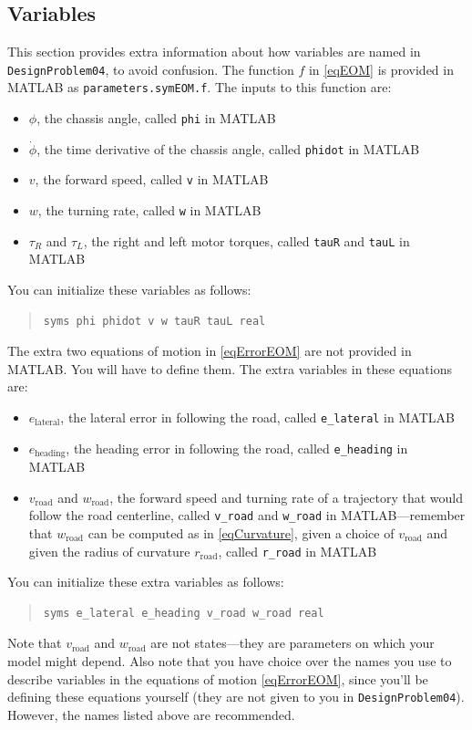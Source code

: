 \documentclass[12pt]{article}
\begin{document}
\subsection{Variables}

This section provides extra information about how variables are named in \lstinline|DesignProblem04|, to avoid confusion. The function $f$ in \eqref{eqEOM} is provided in MATLAB as \lstinline|parameters.symEOM.f|. The inputs to this function are:
\begin{itemize}
\item $\phi$, the chassis angle, called \lstinline|phi| in MATLAB
\item $\dot{\phi}$, the time derivative of the chassis angle, called \lstinline|phidot| in MATLAB
\item $v$, the forward speed, called \lstinline|v| in MATLAB
\item $w$, the turning rate, called \lstinline|w| in MATLAB
\item $\tau_{R}$ and $\tau_{L}$, the right and left motor torques, called \lstinline|tauR| and \lstinline|tauL| in MATLAB
\end{itemize}
You can initialize these variables as follows:
\begin{quote}
\begin{lstlisting}
syms phi phidot v w tauR tauL real
\end{lstlisting}
\end{quote}
The extra two equations of motion in \eqref{eqErrorEOM} are not provided in MATLAB. You will have to define them. The extra variables in these equations are:
\begin{itemize}
\item $e_\text{lateral}$, the lateral error in following the road, called \lstinline|e_lateral| in MATLAB
\item $e_\text{heading}$, the heading error in following the road, called \lstinline|e_heading| in MATLAB
\item $v_\text{road}$ and $w_\text{road}$, the forward speed and turning rate of a trajectory that would follow the road centerline, called \lstinline|v_road| and \lstinline|w_road| in MATLAB---remember that $w_\text{road}$ can be computed as in \eqref{eqCurvature}, given a choice of $v_\text{road}$ and given the radius of curvature $r_\text{road}$, called \lstinline|r_road| in MATLAB
\end{itemize}
You can initialize these extra variables as follows:
\begin{quote}
\begin{lstlisting}
syms e_lateral e_heading v_road w_road real
\end{lstlisting}
\end{quote}
Note that $v_\text{road}$ and $w_\text{road}$ are not states---they are parameters on which your model might depend. Also note that you have choice over the names you use to describe variables in the equations of motion \eqref{eqErrorEOM}, since you'll be defining these equations yourself (they are not given to you in \lstinline|DesignProblem04|). However, the names listed above are recommended.
\end{document}
